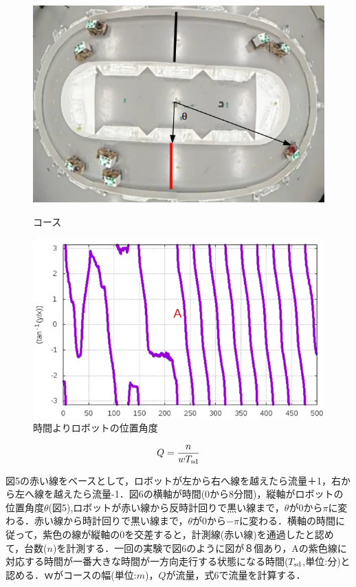 \documentclass[twocolumn]{jarticle} %
\begin{document}
\begin{figure}[h]
    \begin{minipage}{0.48\linewidth}
        \centering
        \includegraphics[width=1.0\linewidth]{course3.jpg}
        \caption{コース}
    \end{minipage}
    \begin{minipage}{0.48\linewidth}
        \centering
        \includegraphics[width=1.0\linewidth]{number2.jpg}
        \caption{時間よりロボットの位置角度}
    \end{minipage}
\end{figure}

\begin{equation}
Q = \frac{n}{wT_{\rm sd}}
\end{equation}

図5の赤い線をベースとして，ロボットが左から右へ線を越えたら流量＋1，右から左へ線を越えたら流量-1．図6の横軸が時間(0から8分間)，縦軸がロボットの位置角度$\theta$(図5),ロボットが赤い線から反時計回りで黒い線まで，$\theta$が0から$\pi$に変わる．赤い線から時計回りで黒い線まで，$\theta$が0から$-\pi$に変わる．横軸の時間に従って，紫色の線が縦軸の0を交差すると，計測線(赤い線)を通過したと認めて，台数($n$)を計測する．一回の実験で図6のように図が８個あり，Aの紫色線に対応する時間が一番大きな時間が一方向走行する状態になる時間($T_{\rm sd}$,単位:分)と認める．$ｗ$がコースの幅(単位:$m$)，$Q$が流量，式6で流量を計算する．
\end{document}

